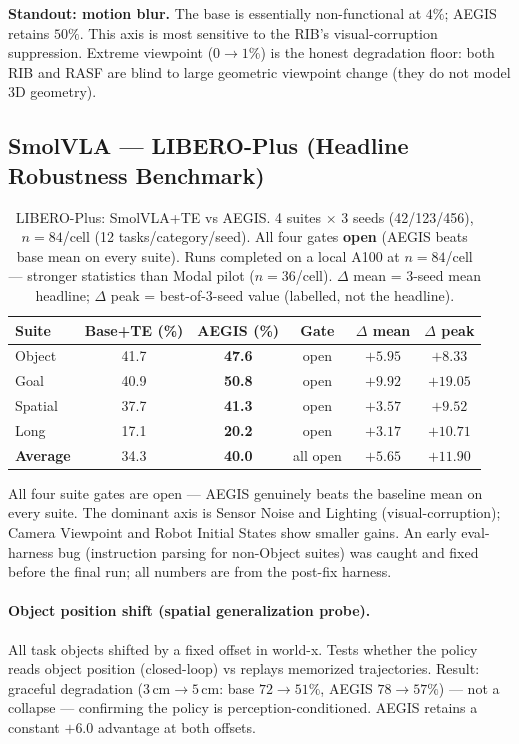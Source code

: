 \documentclass[11pt,a4paper]{article}
\newcommand{\win}[1]{{\color{frozengreen}\textbf{#1}}}
\begin{document}
\textbf{Standout: motion blur.} The base is essentially non-functional at $4\%$;
AEGIS retains $50\%$. This axis is most sensitive to the RIB's visual-corruption suppression.
Extreme viewpoint ($0\to1\%$) is the honest degradation floor: both RIB and RASF
are blind to large geometric viewpoint change (they do not model 3D geometry).

\subsection{SmolVLA — LIBERO-Plus (Headline Robustness Benchmark)}
\label{sec:smolvla_plus}

\begin{table}[H]
\centering
\caption{LIBERO-Plus: SmolVLA+TE vs AEGIS. 4 suites $\times$ 3 seeds (42/123/456),
$n=84$/cell (12 tasks/category/seed). All four gates \textbf{open} (AEGIS beats base mean on
every suite). Runs completed on a local A100 at $n=84$/cell — stronger statistics than Modal
pilot ($n=36$/cell). $\Delta$ mean = 3-seed mean headline; $\Delta$ peak = best-of-3-seed value
(labelled, not the headline).}
\label{tab:smolvla_lplus}
\small
\begin{tabular}{lccccc}
\toprule
Suite & Base+TE (\%) & AEGIS (\%) & Gate & $\Delta$ mean & $\Delta$ peak \\
\midrule
Object  & 41.7 & \win{47.6} & open & $+5.95$ & $+8.33$ \\
Goal    & 40.9 & \win{50.8} & open & $+9.92$ & $+19.05$ \\
Spatial & 37.7 & \win{41.3} & open & $+3.57$ & $+9.52$ \\
Long    & 17.1 & \win{20.2} & open & $+3.17$ & $+10.71$ \\
\midrule
\textbf{Average} & 34.3 & \win{40.0} & all open & $+5.65$ & $+11.90$ \\
\bottomrule
\end{tabular}
\end{table}

All four suite gates are open — AEGIS genuinely beats the baseline mean on every suite.
The dominant axis is Sensor Noise and Lighting (visual-corruption); Camera Viewpoint
and Robot Initial States show smaller gains. An early eval-harness bug (instruction
parsing for non-Object suites) was caught and fixed before the final run; all numbers
are from the post-fix harness.

\paragraph{Object position shift (spatial generalization probe).}
All task objects shifted by a fixed offset in world-x. Tests whether the policy
reads object position (closed-loop) vs replays memorized trajectories.
Result: graceful degradation ($3\,\text{cm}\!\to\!5\,\text{cm}$: base $72\to51\%$,
AEGIS $78\to57\%$) — not a collapse — confirming the policy is perception-conditioned.
AEGIS retains a constant $+6.0$ advantage at both offsets.
\end{document}
